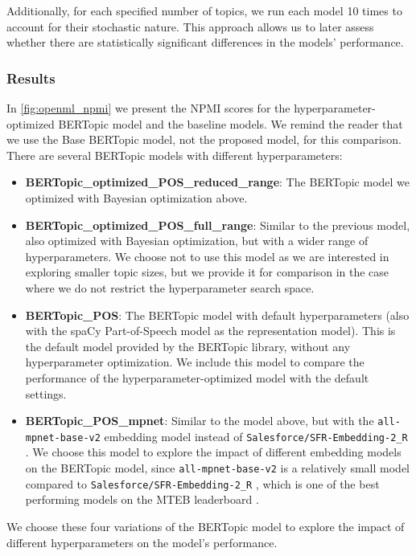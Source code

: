 Additionally, for each specified number of topics, we run each model 10 times to account for their stochastic nature. This approach allows us to later assess whether there are statistically significant differences in the models' performance.

\subsubsection{Results}
In \cref{fig:openml_npmi} we present the NPMI scores for the hyperparameter-optimized BERTopic model and the baseline models. We remind the reader that we use the Base BERTopic model, not the proposed model, for this comparison. There are several BERTopic models with different hyperparameters:
\begin{itemize}
    \item \textbf{BERTopic\_optimized\_POS\_reduced\_range}: The BERTopic model we optimized with Bayesian optimization above.
    \item \textbf{BERTopic\_optimized\_POS\_full\_range}: Similar to the previous model, also optimized with Bayesian optimization, but with a wider range of hyperparameters. We choose not to use this model as we are interested in exploring smaller topic sizes, but we provide it for comparison in the case where we do not restrict the hyperparameter search space.
    \item \textbf{BERTopic\_POS}: The BERTopic model with default hyperparameters (also with the spaCy Part-of-Speech model as the representation model). This is the default model provided by the BERTopic library, without any hyperparameter optimization. We include this model to compare the performance of the hyperparameter-optimized model with the default settings.
    \item \textbf{BERTopic\_POS\_mpnet}: Similar to the model above, but with the \texttt{all-mpnet-base-v2} embedding model instead of \texttt{Salesforce/\allowbreak SFR-Embedding-2\allowbreak\_R} \cite{noauthor_salesforcesfr-embedding-2_r_2024}. We choose this model to explore the impact of different embedding models on the BERTopic model, since \texttt{all\allowbreak-mpnet\allowbreak-base\allowbreak-v2} is a relatively small model compared to \texttt{Salesforce/\allowbreak SFR-Embedding-2\allowbreak\_R} \cite{noauthor_salesforcesfr-embedding-2_r_2024}, which is one of the best performing models on the MTEB leaderboard \cite{muennighoff_mteb_2023}.
\end{itemize}

We choose these four variations of the BERTopic model to explore the impact of different hyperparameters on the model's performance. 

